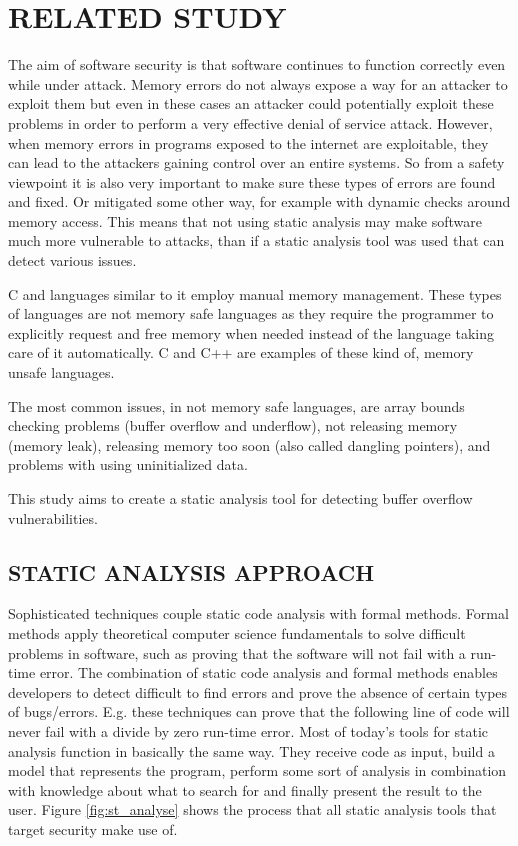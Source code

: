 \chapter{RELATED STUDY}

The aim of software security is that software continues to function correctly even while under attack. Memory errors do not always expose a way for an attacker to exploit them but even in these cases an attacker could potentially exploit these problems in order to perform a very effective denial of service attack. However, when memory errors in programs exposed to the internet are exploitable, they can lead to the attackers gaining control over an entire systems. So from a safety viewpoint it is also very important to make sure these types of errors are found and fixed. Or mitigated some other way, for example with dynamic checks around memory access. This means that not using static analysis may make software much more vulnerable to attacks, than if a static analysis tool was used that can detect various issues.

C and languages similar to it employ manual memory management. These types of languages are not memory safe languages as they require the programmer to explicitly request and free memory when needed instead of the language taking care of it automatically. C and C++ are examples of these kind of, memory unsafe languages. 

The most common issues, in not memory safe languages, are array bounds checking problems (buffer overflow and underflow), not releasing memory (memory leak), releasing memory too soon (also called dangling pointers), and problems with using uninitialized data. 

This study aims to create a static analysis tool for detecting buffer overflow vulnerabilities.

\section{STATIC ANALYSIS APPROACH}
Sophisticated techniques couple static code analysis with formal methods. Formal methods apply theoretical computer science fundamentals to solve difficult problems in software, such as proving that the software will not fail with a run-time error. The combination of static code analysis and formal methods enables developers to detect difficult to find errors and prove the absence of certain types of bugs/errors. E.g. these techniques can prove that the following line of code will never fail with a divide by zero run-time error. Most of today’s tools for static analysis function in basically the same way. They receive code as input, build a model that represents the program, perform some sort of analysis in combination with knowledge about what to search for and finally present the result to the user. Figure \ref{fig:st_analyse} shows the process that all static analysis tools that target security make use of.

